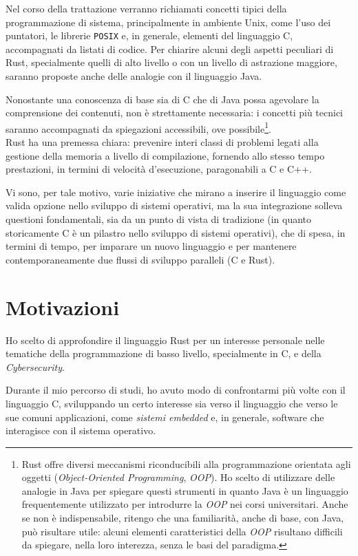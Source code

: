  Nel corso della trattazione verranno richiamati concetti tipici della programmazione di sistema, principalmente
in ambiente Unix, come l'uso dei puntatori, le librerie \texttt{POSIX} e, in generale, elementi del linguaggio C, accompagnati da listati di codice.
Per chiarire alcuni degli aspetti peculiari di Rust, specialmente quelli di alto livello o con un livello di astrazione maggiore, saranno
 proposte anche delle analogie con il linguaggio Java.

Nonostante una conoscenza di base sia di C che di Java possa agevolare la comprensione dei contenuti, non è strettamente necessaria:
i concetti più tecnici saranno accompagnati da spiegazioni accessibili, ove possibile\footnote{Rust offre diversi meccanismi riconducibili alla 
programmazione orientata agli oggetti (\textit{Object-Oriented Programming}, \textit{OOP}). Ho scelto di utilizzare delle analogie in Java per spiegare
questi strumenti in quanto Java è un linguaggio frequentemente utilizzato per introdurre la \textit{OOP} nei corsi universitari. 
Anche se non è indispensabile, ritengo che una familiarità, anche di base, con Java, può risultare utile: alcuni elementi caratteristici della \textit{OOP} risultano difficili 
da spiegare, nella loro interezza, senza le basi del paradigma.}.\\


\noindent Rust ha una premessa chiara: prevenire interi classi di problemi legati
 alla gestione della memoria a livello di compilazione, 
fornendo allo stesso tempo prestazioni, in termini di velocità d'esecuzione, 
paragonabili a C e C++. 

Vi sono, per tale motivo, varie iniziative che mirano a inserire il linguaggio
 come valida opzione nello sviluppo di sistemi operativi,
ma la sua integrazione solleva questioni fondamentali, sia da un punto di vista
 di tradizione (in quanto storicamente C è un pilastro nello sviluppo di sistemi
  operativi), che di spesa, in termini di tempo, 
 per imparare un nuovo linguaggio e per mantenere
  contemporaneamente due flussi di sviluppo paralleli (C e Rust).

\section{Motivazioni}
Ho scelto di approfondire il linguaggio Rust per un interesse personale nelle tematiche della 
programmazione di basso livello, specialmente in C, e della \textit{Cybersecurity}.

Durante il mio percorso di studi, ho avuto modo di confrontarmi più volte con il linguaggio C, sviluppando 
un certo interesse sia verso il linguaggio che verso le sue comuni applicazioni, come \textit{sistemi embedded} e, in generale, software che 
interagisce con il sistema operativo. 

